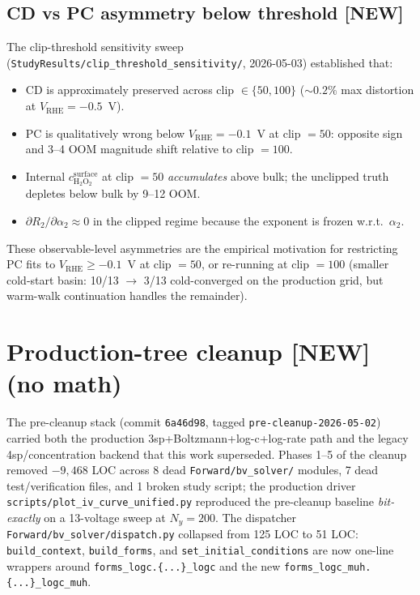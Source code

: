 \documentclass[11pt]{article}
\newcommand{\new}{\textcolor{red!70!black}{[NEW]}}
\newcommand{\Htwo}{\text{H}_2\text{O}_2}
\begin{document}
\subsection{CD vs PC asymmetry below threshold \new}
The clip-threshold sensitivity sweep
(\texttt{StudyResults/clip\_threshold\_sensitivity/}, 2026-05-03)
established that:
\begin{itemize}[leftmargin=*]
\item CD is approximately preserved across clip $\in\{50,100\}$
      ($\sim 0.2\%$ max distortion at $V_{\mathrm{RHE}}=-0.5$~V).
\item PC is qualitatively wrong below $V_{\mathrm{RHE}}=-0.1$~V at
      clip $=50$: opposite sign and 3--4 OOM magnitude shift relative
      to clip $=100$.
\item Internal $c_{\Htwo}^{\mathrm{surface}}$ at clip $=50$
      \emph{accumulates} above bulk; the unclipped truth depletes
      below bulk by 9--12 OOM.
\item $\partial R_2/\partial \alpha_2 \approx 0$ in the clipped
      regime because the exponent is frozen w.r.t.\ $\alpha_2$.
\end{itemize}
These observable-level asymmetries are the empirical motivation for
restricting PC fits to $V_{\mathrm{RHE}}\ge -0.1$~V at clip $=50$, or
re-running at clip $=100$ (smaller cold-start basin: 10/13 $\to$
3/13 cold-converged on the production grid, but warm-walk
continuation handles the remainder).

\section{Production-tree cleanup \new{} (no math)}
\label{sec:cleanup}

The pre-cleanup stack (commit \texttt{6a46d98}, tagged
\texttt{pre-cleanup-2026-05-02}) carried both the production
3sp+Boltzmann+log-c+log-rate path and the legacy 4sp/concentration
backend that this work superseded.  Phases 1--5 of the cleanup
removed $-9{,}468$ LOC across 8 dead \texttt{Forward/bv\_solver/}
modules, 7 dead test/verification files, and 1 broken study
script; the production driver
\texttt{scripts/plot\_iv\_curve\_unified.py} reproduced the
pre-cleanup baseline \emph{bit-exactly} on a 13-voltage sweep at
$N_y=200$.  The dispatcher
\texttt{Forward/bv\_solver/dispatch.py} collapsed from 125 LOC to
51 LOC: \texttt{build\_context}, \texttt{build\_forms}, and
\texttt{set\_initial\_conditions} are now one-line wrappers around
\texttt{forms\_logc.\{...\}\_logc} and the new
\texttt{forms\_logc\_muh.\{...\}\_logc\_muh}.
\end{document}
